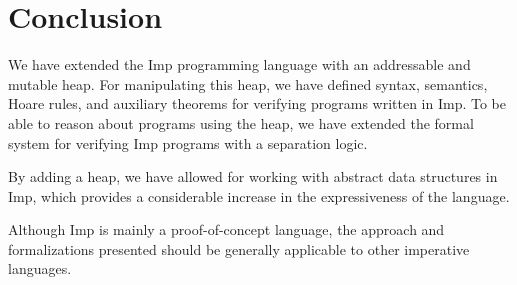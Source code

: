 \section{Conclusion}
\label{sec:conclusion}
We have extended the Imp programming language with an addressable and mutable heap. For manipulating this heap, we have defined syntax, semantics, Hoare rules, and auxiliary theorems for verifying programs written in Imp. To be able to reason about programs using the heap, we have extended the formal system for verifying Imp programs with a separation logic.

By adding a heap, we have allowed for working with abstract data structures in Imp, which provides a considerable increase in the expressiveness of the language.

Although Imp is mainly a proof-of-concept language, the approach and formalizations presented should be generally applicable to other imperative languages. 